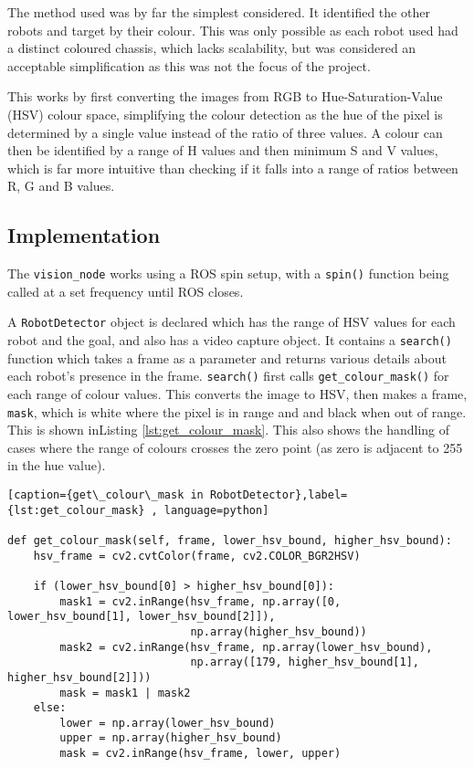 The method used was by far the simplest considered. It identified the other robots and target
by their colour. This was only possible as each robot used had a distinct coloured chassis,
which lacks scalability, but was considered an acceptable simplification as this was not the
focus of the project.

This works by first converting the images from RGB to Hue-Saturation-Value (HSV) colour space,
simplifying the colour detection as the hue of the pixel is determined by a single value
instead of the ratio of three values. A colour can then be identified by a range of H values
and then minimum S and V values, which is far more intuitive than checking if it falls into a
range of ratios between R, G and B values.

\subsection{Implementation}\label{soft/cv/impl}
The \verb|vision_node| works using a ROS spin setup, with a \verb|spin()| function being
called at a set frequency until ROS closes.

A \verb|RobotDetector| object is declared which has the range of HSV values for each robot
and the goal, and also has a video capture object. It contains a \verb|search()| function which
takes a frame as a parameter and returns various details about each robot's presence in the
frame. \verb|search()| first calls \verb|get_colour_mask()| for each range of colour
values. This converts the image to HSV, then makes a frame, \verb|mask|, which is white where
the pixel is in range and and black when out of range. This is shown inListing
\ref{lst:get_colour_mask}. This also shows the handling of cases where the range of colours
crosses the zero point (as zero is adjacent to 255 in the hue value).

\begin{lstlisting}[caption={get\_colour\_mask in RobotDetector},label={lst:get_colour_mask} , language=python]

def get_colour_mask(self, frame, lower_hsv_bound, higher_hsv_bound):
    hsv_frame = cv2.cvtColor(frame, cv2.COLOR_BGR2HSV)

    if (lower_hsv_bound[0] > higher_hsv_bound[0]):
        mask1 = cv2.inRange(hsv_frame, np.array([0, lower_hsv_bound[1], lower_hsv_bound[2]]),
                            np.array(higher_hsv_bound))
        mask2 = cv2.inRange(hsv_frame, np.array(lower_hsv_bound),
                            np.array([179, higher_hsv_bound[1], higher_hsv_bound[2]]))
        mask = mask1 | mask2
    else:
        lower = np.array(lower_hsv_bound)
        upper = np.array(higher_hsv_bound)
        mask = cv2.inRange(hsv_frame, lower, upper)
\end{lstlisting}

